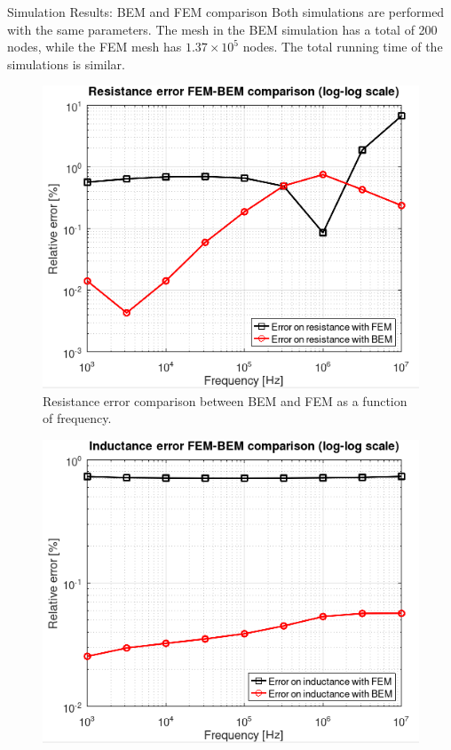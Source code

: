 \documentclass[aspectratio=54,xcolor=dvipsnames]{beamer}
\begin{document}
\begin{frame}{Simulation Results: BEM and FEM comparison}
    \scriptsize
    Both simulations are performed with the same parameters. The mesh in the BEM simulation has a total of 200 nodes, while the FEM mesh has $1.37 \times 10^5$ nodes. The total running time of the simulations is similar.
    \begin{center}
    \begin{minipage}{0.49\textwidth}
        \centering
        \begin{figure}[H]
            \includegraphics[width=\textwidth]{Images/bem-fem_resistance.png}
            \caption{Resistance error comparison between BEM and FEM as a function of frequency.}
        \end{figure}
    \end{minipage}\hfill
    \begin{minipage}{0.49\textwidth}
        \centering
        \begin{figure}[H]
            \includegraphics[width=\textwidth]{Images/bem-fem_inductance.png}

\end{figure}
\end{minipage}
\end{center}
\end{frame}
\end{document}
